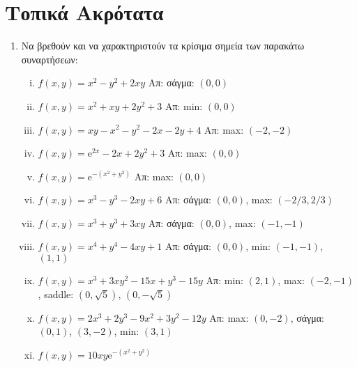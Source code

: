 


\pagestyle{askhseis}

\renewcommand{\vec}{\mathbf}



\begin{center}
  \minibox{\large \bfseries \textcolor{Col1}{Ασκήσεις στα Ακρότατα}}
\end{center}

\vspace{\baselineskip}

\section*{Τοπικά Ακρότατα}

\begin{enumerate}
  \item Να βρεθούν και να χαρακτηριστούν τα κρίσιμα σημεία  των παρακάτω συναρτήσεων:
    \begin{enumerate}[i)]
      \item $ f(x,y) = x^{2}-y^{2}+2xy $
        \hfill Απ:  σάγμα: $(0,0) $ 
      \item $ f(x,y) = x^{2}+xy+2y^{2}+3 $
        \hfill Απ:  min: $(0,0) $ 
      \item $ f(x,y) = xy-x^{2}-y^2-2x-2y+4 $
        \hfill Απ: max: $(-2,-2)  $
      \item $ f(x,y) = \mathrm{e}^{2x} - 2x+2y^{2}+3 $
        \hfill Απ:  max: $(0,0) $ 
      \item $ f(x,y) = \mathrm{e}^{-(x^{2}+y^{2})} $
        \hfill Απ:  max: $(0,0) $ 
      \item $ f(x,y) = x^{3}-y^{3}-2xy+6 $
        \hfill Απ: σάγμα: $ (0,0) $, max: $ (-2/3, 2/3) $  
      \item $ f(x,y) = x^{3}+y^{3}+3xy $ 
        \hfill Απ: σάγμα: $ (0,0) $, max: $ (-1,-1) $ 
      \item $ f(x,y) = x^{4}+y^{4}-4xy+1 $
        \hfill Απ:  σάγμα: $(0,0) $,  min: $(-1,-1) $, $(1,1)  $ 
      \item $ f(x,y) = x^{3}+3xy^{2}-15x+y^{3}-15y $
        \hfill Απ: min: $ (2,1) $, max: $ (-2,-1) $, saddle: $ (0, \sqrt{5}) $, $ (0,-
        \sqrt{5}) $
      \item $ f(x,y) = 2x^{3}+2y^{3}-9x^{2}+3y^{2}-12y $
        \hfill Απ: max: $ (0,-2) $, σάγμα: $ (0,1) $, $ (3,-2) $, min: $ (3,1) $ 
      \item $ f(x,y) = 10xy \mathrm{e}^{-(x^{2}+y^2)} $



\end{enumerate}
\end{enumerate}
